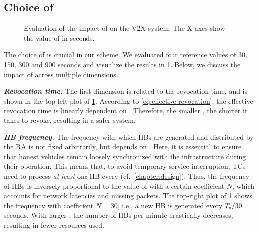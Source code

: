 

\subsection{Choice of \paramtt{}}
\label{section:eval-tv}

\begin{figure}[t]
  \hspace*{-0.3cm}
  \resizebox{\linewidth}{!} {
    
  } \caption{Evaluation of the impact of \paramtt{} on the \ac{V2X} system. The
  X axes show the value of \paramtt{} in seconds.}
  \label{fig:eval-tv}
\end{figure}

The choice of \paramtt{} is crucial in our scheme. We evaluated four reference
values of 30, 150, 300 and 900 seconds and visualize the results in
\cref{fig:eval-tv}. Below, we discuss the impact of \paramtt{} across multiple
dimensions. 

\noindent\textbf{\emph{Revocation time.}}
%
The first dimension is related to the revocation time, and is shown in the
top-left plot of \cref{fig:eval-tv}. According to
\cref{eq:effective-revocation}, the effective revocation time \paramteff{} is
linearly dependent on \paramtt{}. Therefore, the smaller \paramtt, the shorter
it takes to revoke, resulting in a safer system.

\noindent\textbf{\emph{\ac{HB} frequency.}}
%
The frequency with which \acp{HB} are generated and distributed by the \ac{RA}
is not fixed arbitrarily, but depends on \paramtt{}. Here, it is essential to
ensure that honest vehicles remain loosely synchronized with the infrastructure
during their operation. This means that, to avoid temporary service
interruption, \acp{TC} need to process \emph{at least} one \ac{HB} every
\paramtt{} (cf.~\cref{chapter:design}). Thus, the frequency of \acp{HB} is
inversely proportional to the value of \paramtt{} with a certain coefficient
$N$, which accounts for network latencies and missing packets. The top-right
plot of \cref{fig:eval-tv} shows the frequency with coefficient $N = 30$, i.e.,
a new \ac{HB} is generated every $\emph{$T_{\mathsf{v}}$} / 30$ seconds. With larger
\paramtt{}, the number of \acp{HB} per minute drastically decreases, resulting
in fewer resources used.

